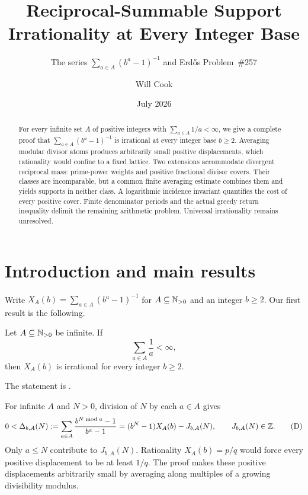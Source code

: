\documentclass[11pt]{article}
\title{Reciprocal-Summable Support Irrationality at Every Integer Base}
\subtitle{The series $\sum_{a\in A}(b^a-1)^{-1}$ and Erd\H{o}s Problem~\#257}
\author{Will Cook}
\date{July 2026}
\begin{document}
\maketitle
\noteprovenance

\begin{abstract}
For every infinite set $A$ of positive integers with $\sum_{a\in A}1/a<\infty$,
we give a complete proof that $\sum_{a\in A}(b^a-1)^{-1}$ is irrational
at every integer base $b\ge2$.  Averaging modular divisor atoms produces
arbitrarily small positive displacements, which rationality would confine
to a fixed lattice.  Two extensions accommodate divergent reciprocal mass:
prime-power weights and positive fractional divisor covers.  Their classes
are incomparable, but a common finite averaging estimate combines them
and yields supports in neither class.  A logarithmic incidence invariant
quantifies the cost of every positive cover.  Finite denominator periods
and the actual greedy return inequality delimit the remaining arithmetic
problem.  Universal irrationality remains unresolved.
\end{abstract}

\section{Introduction and main results}\label{sec:problem}
Write $X_A(b)=\sum_{a\in A}(b^a-1)^{-1}$ for $A\subseteq\mathbb{N}_{>0}$ and an
integer $b\ge2$.  Our first result is the following.

\begin{theorem}\label{res:reciprocal-support}
Let $A\subseteq\mathbb{N}_{>0}$ be infinite.  If
\[
  \sum_{a\in A}\frac1a<\infty,
\]
then \(X_A(b)\) is irrational for every integer \(b\ge2\).
\end{theorem}

The statement is
\href{https://github.com/wcook04/plectis-erdos/blob/f36a98bf3d3e6f65f1074e3b800e3293d5b8a51a/Erdos249257/AllBaseReciprocalSupportIrrationality.lean#L395}{}.

For infinite $A$ and $N>0$, division of $N$ by each $a\in A$ gives
\[
 0<\Delta_{b,A}(N)
 :=\sum_{a\in A}\frac{b^{N\bmod a}-1}{b^a-1}
 =(b^N-1)X_A(b)-J_{b,A}(N),\qquad J_{b,A}(N)\in\Z.
 \label{eq:intro-displacement}\tag{D}
\]
Only $a\le N$ contribute to $J_{b,A}(N)$.  Rationality $X_A(b)=p/q$
would force every positive displacement to be at least $1/q$.
The proof makes these positive displacements arbitrarily small by
averaging along multiples of a growing divisibility modulus.
\end{document}
